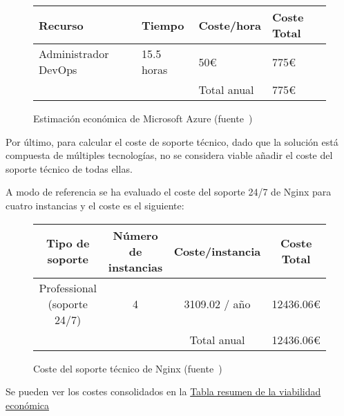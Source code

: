 \begin{figure}[!ht]
  \centering
  \begin{tabular}{|p{}|p{}|p{}|p{}|}
  \hline
  {\bf Recurso}               & {\bf Tiempo}  & {\bf Coste/hora}    & {\bf Coste Total}           \\
  \hline
    Administrador DevOps      & 15.5 horas  & 50€                 & 775€ \\
  \hline
                              &             & Total anual         & 775€ \\
  \hline
  \end{tabular}
  \label{tabla:azurecalculatorsalary}
  \caption{Estimación económica de Microsoft Azure (fuente~\cite{azurecalculator})}
\end{figure}

\par Por último, para calcular el coste de soporte técnico, dado que la solución está compuesta de múltiples tecnologías, no se considera viable añadir el coste del soporte técnico de todas ellas.
\par A modo de referencia se ha evaluado el coste del soporte 24/7 de Nginx para cuatro instancias y el coste es el siguiente:

\begin{figure}[!ht]
  \centering
  \begin{tabular}{| c | c | c | c |}
  \hline
  {\bf Tipo de soporte}           & {\bf Número de instancias}    & {\bf Coste/instancia}   & {\bf Coste Total}   \\
  \hline
    Professional (soporte 24/7)   & 4                             & 3109.02 / año           & 12436.06€           \\
  \hline
                                  &                               & Total anual             & 12436.06€           \\
  \hline
  \end{tabular}
  \label{tabla:nginxplus}
  \caption{Coste del soporte técnico de Nginx (fuente~\cite{nginxplus})}
\end{figure}

\par Se pueden ver los costes consolidados en la \hyperref[tabla:costesresumen]{Tabla resumen de la viabilidad económica} \\

